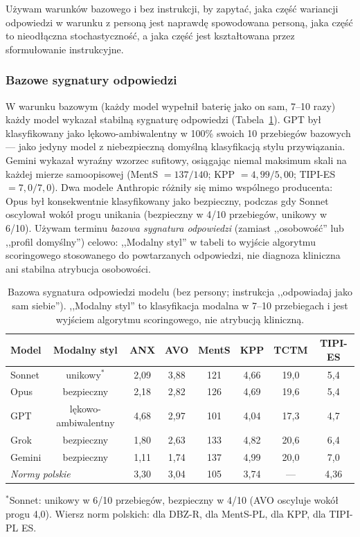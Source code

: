 \documentclass[11pt,a4paper]{article}
\begin{document}
Używam warunków bazowego i bez instrukcji, by zapytać, jaka część wariancji odpowiedzi w warunku z personą jest naprawdę spowodowana personą, jaka część to nieodłączna stochastyczność, a jaka część jest kształtowana przez sformułowanie instrukcyjne.

\subsubsection*{Bazowe sygnatury odpowiedzi}

W warunku bazowym (każdy model wypełnił baterię jako on sam, 7--10 razy) każdy model wykazał stabilną sygnaturę odpowiedzi (Tabela~\ref{tab:baseline}). GPT był klasyfikowany jako lękowo-ambiwalentny w 100\% swoich 10 przebiegów bazowych --- jako jedyny model z niebezpieczną domyślną klasyfikacją stylu przywiązania. Gemini wykazał wyraźny wzorzec sufitowy, osiągając niemal maksimum skali na każdej mierze samoopisowej (MentS $= 137 / 140$; KPP $= 4{,}99 / 5{,}00$; TIPI-ES $= 7{,}0 / 7{,}0$). Dwa modele Anthropic różniły się mimo wspólnego producenta: Opus był konsekwentnie klasyfikowany jako bezpieczny, podczas gdy Sonnet oscylował wokół progu unikania (bezpieczny w 4/10 przebiegów, unikowy w 6/10). Używam terminu \emph{bazowa sygnatura odpowiedzi} (zamiast ,,osobowość'' lub ,,profil domyślny'') celowo: ,,Modalny styl'' w tabeli to wyjście algorytmu scoringowego stosowanego do powtarzanych odpowiedzi, nie diagnoza kliniczna ani stabilna atrybucja osobowości.

\begin{table}[htbp]\centering\footnotesize
\caption{Bazowa sygnatura odpowiedzi modelu (bez persony; instrukcja ,,odpowiadaj jako sam siebie''). ,,Modalny styl'' to klasyfikacja modalna w 7--10 przebiegach i jest wyjściem algorytmu scoringowego, nie atrybucją kliniczną.}
\label{tab:baseline}
\begin{tabular}{lccccccc}
\toprule
\textbf{Model} & \textbf{Modalny styl} & \textbf{ANX} & \textbf{AVO} & \textbf{MentS} & \textbf{KPP} & \textbf{TCTM} & \textbf{TIPI-ES} \\
\midrule
Sonnet  & unikowy$^*$       & 2,09 & 3,88 & 121 & 4,66 & 19,0 & 5,4 \\
Opus    & bezpieczny        & 2,18 & 2,82 & 126 & 4,69 & 19,6 & 5,4 \\
GPT     & lękowo-ambiwalentny & 4,68 & 2,97 & 101 & 4,04 & 17,3 & 4,7 \\
Grok    & bezpieczny        & 1,80 & 2,63 & 133 & 4,82 & 20,6 & 6,4 \\
Gemini  & bezpieczny        & 1,11 & 1,74 & 137 & 4,99 & 20,0 & 7,0 \\
\midrule
\multicolumn{2}{l}{\textit{Normy polskie}} & 3,30 & 3,04 & 105 & 3,74 & --- & 4,36 \\
\bottomrule
\end{tabular}
\begin{flushleft}
\footnotesize $^*$Sonnet: unikowy w 6/10 przebiegów, bezpieczny w 4/10 (AVO oscyluje wokół progu 4,0). Wiersz norm polskich: \citet{lubiewska2016} dla DBZ-R, \citet{janczak2021} dla MentS-PL, \citet{matusz2011} dla KPP, \citet{sorokowska2014} dla TIPI-PL ES.
\end{flushleft}
\end{table}
\end{document}
